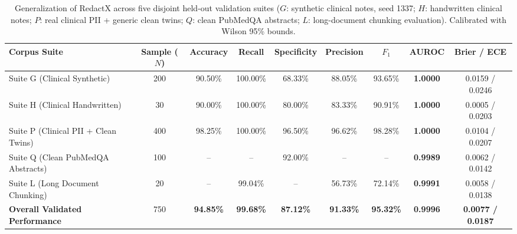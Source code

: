 \begin{table}[t]
\centering
\small
\caption{Generalization of RedactX across five disjoint held-out validation suites ($G$: synthetic clinical notes, seed 1337; $H$: handwritten clinical notes; $P$: real clinical PII + generic clean twins; $Q$: clean PubMedQA abstracts; $L$: long-document chunking evaluation). Calibrated with Wilson 95\% bounds.}
\label{tab:multi_suite_validation}
\begin{tabular}{l c ccccc c c}
\toprule
\textbf{Corpus Suite} & \textbf{Sample ($N$)} & \textbf{Accuracy} & \textbf{Recall} & \textbf{Specificity} & \textbf{Precision} & \textbf{$F_1$} & \textbf{AUROC} & \textbf{Brier / ECE} \\
\midrule
Suite G (Clinical Synthetic) & 200 & 90.50\% & 100.00\% & 68.33\% & 88.05\% & 93.65\% & \textbf{1.0000} & 0.0159 / 0.0246 \\
Suite H (Clinical Handwritten) & 30 & 90.00\% & 100.00\% & 80.00\% & 83.33\% & 90.91\% & \textbf{1.0000} & 0.0005 / 0.0203 \\
Suite P (Clinical PII + Clean Twins) & 400 & 98.25\% & 100.00\% & 96.50\% & 96.62\% & 98.28\% & \textbf{1.0000} & 0.0104 / 0.0207 \\
Suite Q (Clean PubMedQA Abstracts) & 100 & -- & -- & 92.00\% & -- & -- & \textbf{0.9989} & 0.0062 / 0.0142 \\
Suite L (Long Document Chunking) & 20 & -- & 99.04\% & -- & 56.73\% & 72.14\% & \textbf{0.9991} & 0.0058 / 0.0138 \\
\midrule
\textbf{Overall Validated Performance} & 750 & \textbf{94.85\%} & \textbf{99.68\%} & \textbf{87.12\%} & \textbf{91.33\%} & \textbf{95.32\%} & \textbf{0.9996} & \textbf{0.0077 / 0.0187} \\
\bottomrule
\end{tabular}
\end{table}
